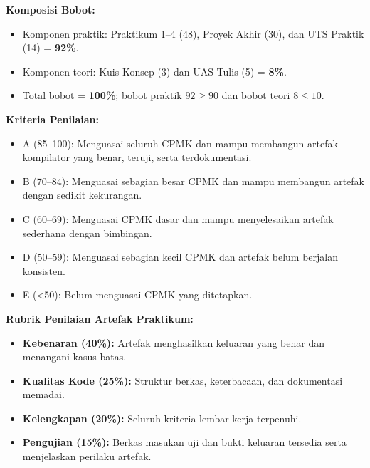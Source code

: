 \documentclass[12pt,a4paper]{article}
\begin{document}
\noindent\textbf{Komposisi Bobot:}
\begin{itemize}[leftmargin=*]
  \item Komponen praktik: Praktikum 1--4 (48), Proyek Akhir (30), dan UTS Praktik (14) = \textbf{92\%}.
  \item Komponen teori: Kuis Konsep (3) dan UAS Tulis (5) = \textbf{8\%}.
  \item Total bobot = \textbf{100\%}; bobot praktik $92 \ge 90$ dan bobot teori $8 \le 10$.
\end{itemize}

\vspace{0.3cm}

\textbf{Kriteria Penilaian:}
\begin{itemize}[leftmargin=*]
  \item A (85--100): Menguasai seluruh CPMK dan mampu membangun artefak kompilator yang benar, teruji, serta terdokumentasi.
  \item B (70--84): Menguasai sebagian besar CPMK dan mampu membangun artefak dengan sedikit kekurangan.
  \item C (60--69): Menguasai CPMK dasar dan mampu menyelesaikan artefak sederhana dengan bimbingan.
  \item D (50--59): Menguasai sebagian kecil CPMK dan artefak belum berjalan konsisten.
  \item E (<50): Belum menguasai CPMK yang ditetapkan.
\end{itemize}

\vspace{0.2cm}

\textbf{Rubrik Penilaian Artefak Praktikum:}
\begin{itemize}[leftmargin=*]
  \item \textbf{Kebenaran (40\%):} Artefak menghasilkan keluaran yang benar dan menangani kasus batas.
  \item \textbf{Kualitas Kode (25\%):} Struktur berkas, keterbacaan, dan dokumentasi memadai.
  \item \textbf{Kelengkapan (20\%):} Seluruh kriteria lembar kerja terpenuhi.
  \item \textbf{Pengujian (15\%):} Berkas masukan uji dan bukti keluaran tersedia serta menjelaskan perilaku artefak.
\end{itemize}

\vspace{0.5cm}

\end{document}
